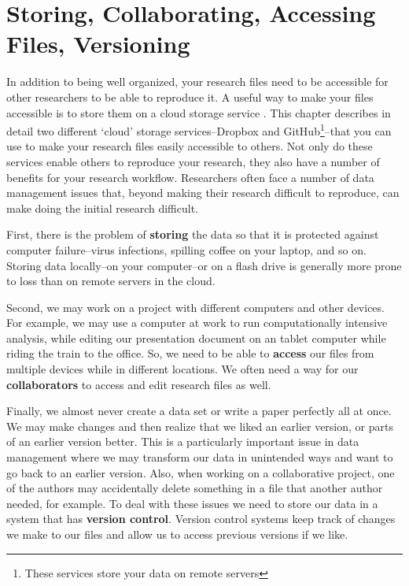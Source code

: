 



\chapter{Storing, Collaborating, Accessing Files, Versioning}\label{Storing}

In addition to being well organized, your research files need to be accessible for other researchers to be able to reproduce it. A useful way to make your files accessible is to store them on a cloud storage service \cite[see][]{Howe2012}. This chapter describes in detail two different `cloud' storage services--Dropbox and GitHub\footnote{These services store your data on remote servers}--that you can use to make your research files easily accessible to others. Not only do these services enable others to reproduce your research, they also have a number of benefits for your research workflow. Researchers often face a number of data management issues that, beyond making their research difficult to reproduce, can make doing the initial research difficult.

First, there is the problem of \textbf{storing} the data so that it is protected against computer failure--virus infections, spilling coffee on your laptop, and so on. Storing data locally--on your computer--or on a flash drive is generally more prone to loss than on remote servers in the cloud.

Second, we may work on a project with different computers and other devices. For example, we may use a computer at work to run computationally intensive analysis, while editing our presentation document on an tablet computer while riding the train to the office. So, we need to be able to \textbf{access} our files from multiple devices while in different locations. We often need a way for our \textbf{collaborators} to access and edit research files as well.

Finally, we almost never create a data set or write a paper perfectly all at once. We may make changes and then realize that we liked an earlier version, or parts of an earlier version better. This is a particularly important issue in data management where we may transform our data in unintended ways and want to go back to an earlier version. Also, when working on a collaborative project, one of the authors may accidentally delete something in a file that another author needed, for example. To deal with these issues we need to store our data in a system that has \textbf{version control}. Version control systems keep track of changes we make to our files and allow us to access previous versions if we
like.

